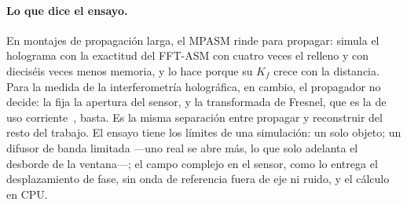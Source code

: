 \paragraph{Lo que dice el ensayo.} En montajes de propagación larga, el MPASM
rinde para propagar: simula el holograma con la exactitud del FFT-ASM con
cuatro veces el relleno y con dieciséis veces menos memoria, y lo hace porque
su $K_f$ crece con la distancia. Para la medida de la interferometría
holográfica, en cambio, el propagador no decide: la fija la apertura del
sensor, y la transformada de Fresnel, que es la de uso
corriente~\cite{schnars2005}, basta. Es la misma separación entre propagar y
reconstruir del resto del trabajo. El ensayo tiene los límites de una
simulación: un solo objeto; un difusor de banda limitada ---uno real se abre
más, lo que solo adelanta el desborde de la ventana---; el campo complejo en el
sensor, como lo entrega el desplazamiento de fase, sin onda de referencia
fuera de eje ni ruido, y el cálculo en CPU.
